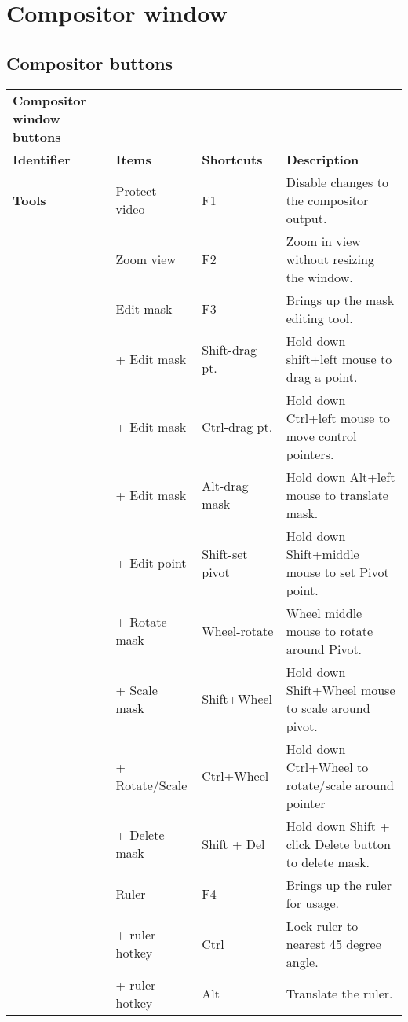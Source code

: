 \section{Compositor window}%
\label{sec:compositor_window_shortcuts}

\subsection*{Compositor buttons}%
\label{ssec:compositor_buttons}

\begin{longtable}[h]{>{\bfseries}p{}p{}p{}p{}}
  \toprule
  \multicolumn{4}{c}%
  {\textcolor{CinRed}{\textbf{Compositor window buttons}}} \\
  Identifier & \textbf{Items} & \textbf{Shortcuts} & \textbf{Description}\\
  \midrule
  \endhead
  \textcolor{CinBlueText}{Tools} & Protect video & F1 & Disable changes to the compositor output. \\
  & Zoom view & F2 & Zoom in view without resizing the window. \\
  & Edit mask & F3 & Brings up the mask editing tool. \\
  & + Edit mask & Shift-drag pt. & Hold down shift+left mouse to drag a point. \\
  & + Edit mask & Ctrl-drag pt. & Hold down Ctrl+left mouse to move control pointers. \\
  & + Edit mask & Alt-drag mask & Hold down Alt+left mouse to translate mask. \\
  & + Edit point & Shift-set pivot & Hold down Shift+middle mouse to set Pivot point. \\
  & + Rotate mask & Wheel-rotate & Wheel middle mouse to rotate around Pivot. \\
  & + Scale mask & Shift+Wheel & Hold down Shift+Wheel mouse to scale around pivot. \\
  & + Rotate/Scale & Ctrl+Wheel & Hold down Ctrl+Wheel to rotate/scale around pointer\\
  & + Delete mask & Shift + Del & Hold down Shift + click Delete button to delete mask. \\
  & Ruler & F4 & Brings up the ruler for usage. \\
  & + ruler hotkey & Ctrl & Lock ruler to nearest 45 degree angle. \\
  & + ruler hotkey & Alt & Translate the ruler. \\

\end{longtable}
